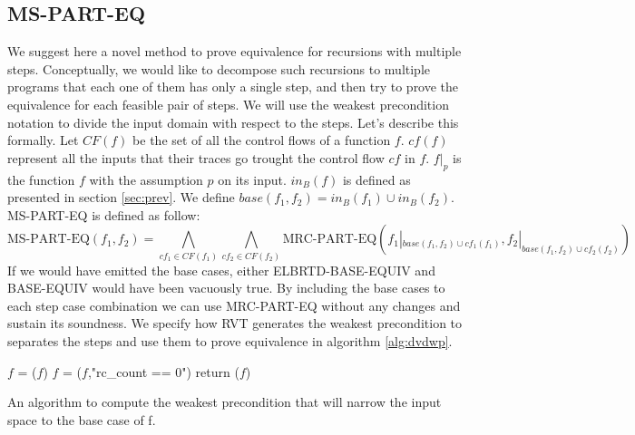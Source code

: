 \subsection{MS-PART-EQ}
We suggest here a novel method to prove equivalence for recursions with multiple steps. Conceptually, we would like to decompose such recursions to multiple programs that each one of them has only a single step, and then try to prove the equivalence for each feasible pair of steps. We will use the weakest precondition notation to divide the input domain with respect to the steps. Let's describe this formally. Let $CF(f)$ be the set of all the control flows of a function $f$. $cf(f)$ represent all the inputs that their traces go trought the control flow $cf$ in $f$. $f|_p$ is the function $f$ with the assumption $p$ on its input. $in_B(f)$ is defined as presented in section \ref{sec:prev}. We define $base(f_1,f_2)=in_B(f_1) \cup in_B(f_2)$. MS-PART-EQ is defined as follow:
\begin{equation}
  \text{MS-PART-EQ}(f_1,f_2) = \bigwedge_{cf_1\in CF(f_1)}\bigwedge_{cf_2\in CF(f_2)}\text{MRC-PART-EQ}(f_1|_{base(f_1,f_2) \cup cf_1(f_1)},f_2|_{base(f_1,f_2) \cup cf_2(f_2)})
\end{equation}
If we would have emitted the base cases, either ELBRTD-BASE-EQUIV and BASE-EQUIV would have been vacuously true. By including the base cases to each step case combination we can use MRC-PART-EQ without any changes and sustain its soundness. We specify how RVT generates the weakest precondition to separates the steps and use them to prove equivalence in algorithm \ref{alg:dvdwp}.
\noindent
\begin{algorithm}
\begin{minipage}{\linewidth}
\begin{algorithmic}[1]
	\State $f$ = ($f$)
    \State $f$ = ($f$,"rc\_count == 0")
    \State return ($f$)
	\EndFunction
\end{algorithmic}
\end{minipage}
\caption{An algorithm to compute the weakest precondition that will narrow the input space to the base case of f.}
\label{alg:WPForBase}
\end{algorithm}

